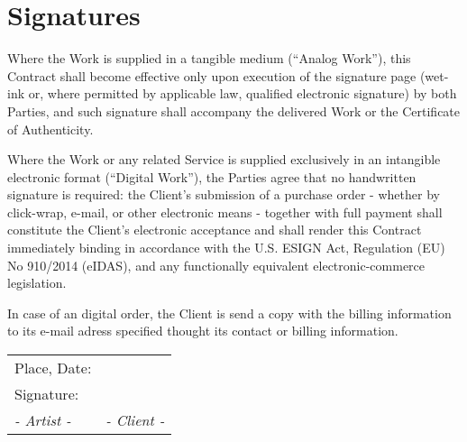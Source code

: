 \section*{Signatures}
Where the Work is supplied in a tangible medium (\enquote{Analog Work}), this 
Contract shall become effective only upon execution of the signature page 
(wet-ink or, where permitted by applicable law, qualified electronic signature) 
by both Parties, and such signature shall accompany the delivered Work or the
Certificate of Authenticity.
\par \vspace{0.25cm}

Where the Work or any related Service is supplied exclusively in an intangible
electronic format (\enquote{Digital Work}), the Parties agree that no 
handwritten signature is required:
the Client's submission of a purchase order - whether by click-wrap, e-mail, or 
other electronic means - together with full payment shall constitute the 
Client's electronic acceptance and shall render this Contract immediately 
binding in accordance with the U.S. ESIGN Act, Regulation (EU) No 910/2014 
(eIDAS), and any functionally equivalent electronic-commerce legislation.
\par \vspace{0.25cm}

In case of an digital order, the Client is send a copy with the billing 
information to its e-mail adress specified thought its contact or billing 
information.
\par \vspace{1cm}

\begin{longtable}[l]{ p{7cm} p{7cm} }
    Place, Date:  
    &  
    \\
    Signature: 
    &  
    \\
    \phantom{"Place, Date":} \textit{- Artist -}
    & \phantom{"Place, Date":} \textit{- Client -}
    \\
\end{longtable}
